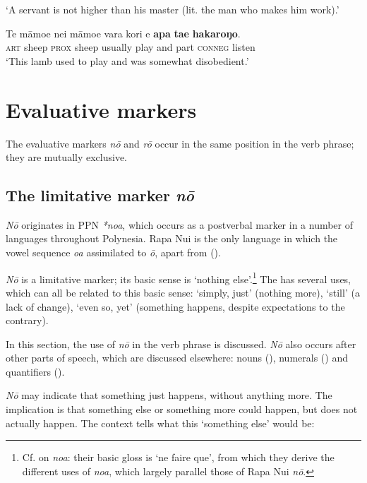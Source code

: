 \glt 
‘A servant is not higher than his master (lit. the man who makes him work).’ \textstyleExampleref{[Mat. 10:24]}
\z

\ea\label{ex:7.101}
\gll Te māmoe nei māmoe vara kori {\ꞌ}e \textbf{{\ꞌ}apa} \textbf{ta{\ꞌ}e} \textbf{hakaroŋo}. \\
\textsc{art} sheep \textsc{prox} sheep usually play and part \textsc{conneg} listen \\

\glt 
‘This lamb used to play and was somewhat disobedient.’ \textstyleExampleref{[R536.009]} 
\z

\section{Evaluative markers}\label{sec:7.4}
The evaluative markers \textit{nō} and \textit{rō} occur in the same position in the verb phrase; they are mutually exclusive. 

\subsection{The limitative marker \textit{nō}}\label{sec:7.4.1}
\textit{Nō} originates in PPN \textit{*noa}, which occurs as a postverbal marker in a number of languages throughout Polynesia. Rapa Nui is the only language in which the vowel sequence \textit{oa} assimilated to \textit{ō}, apart from  (\citealt[100]{ElbertPukui1979}).

\textit{Nō} is a limitative marker; its basic sense is ‘nothing else’.\footnote{\label{fn:345}Cf. \citet[146]{LazardPeltzer2000} on  \textit{noa}: their basic gloss is ‘ne faire que’, from which they derive the different uses of \textit{noa}, which largely parallel those of Rapa Nui \textit{nō}.} The  has several uses, which can all be related to this basic sense: ‘simply, just’ (nothing more), ‘still’ (a lack of change), ‘even so, yet’ (something happens, despite expectations to the contrary).

In this section, the use of \textit{nō} in the verb phrase is discussed. \textit{Nō} also occurs after other parts of speech, which are discussed elsewhere: nouns (), numerals () and quantifiers ().

\textit{Nō} may indicate that something just happens, without anything more. The implication is that something else or something more could happen, but does not actually happen. The context tells what this ‘something else’ would be:

